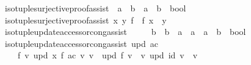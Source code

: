\begin{isabellebody}
\isanewline
\ \ iso{\isacharunderscore}{\kern0pt}tuple{\isacharunderscore}{\kern0pt}surjective{\isacharunderscore}{\kern0pt}proof{\isacharunderscore}{\kern0pt}assist\ {\isacharcolon}{\kern0pt}{\isacharcolon}{\kern0pt}\ {\isachardoublequoteopen}{\isacharprime}{\kern0pt}a\ {\isasymRightarrow}\ {\isacharprime}{\kern0pt}b\ {\isasymRightarrow}\ {\isacharparenleft}{\kern0pt}{\isacharprime}{\kern0pt}a\ {\isasymRightarrow}\ {\isacharprime}{\kern0pt}b{\isacharparenright}{\kern0pt}\ {\isasymRightarrow}\ bool{\isachardoublequoteclose}\ \isanewline
\ \ {\isachardoublequoteopen}iso{\isacharunderscore}{\kern0pt}tuple{\isacharunderscore}{\kern0pt}surjective{\isacharunderscore}{\kern0pt}proof{\isacharunderscore}{\kern0pt}assist\ x\ y\ f\ {\isasymlongleftrightarrow}\ f\ x\ {\isacharequal}{\kern0pt}\ y{\isachardoublequoteclose}\isanewline
\isanewline
{}\isamarkupfalse%
\isanewline
\ \ iso{\isacharunderscore}{\kern0pt}tuple{\isacharunderscore}{\kern0pt}update{\isacharunderscore}{\kern0pt}accessor{\isacharunderscore}{\kern0pt}cong{\isacharunderscore}{\kern0pt}assist\ {\isacharcolon}{\kern0pt}{\isacharcolon}{\kern0pt}\isanewline
\ \ \ \ {\isachardoublequoteopen}{\isacharparenleft}{\kern0pt}{\isacharparenleft}{\kern0pt}{\isacharprime}{\kern0pt}b\ {\isasymRightarrow}\ {\isacharprime}{\kern0pt}b{\isacharparenright}{\kern0pt}\ {\isasymRightarrow}\ {\isacharparenleft}{\kern0pt}{\isacharprime}{\kern0pt}a\ {\isasymRightarrow}\ {\isacharprime}{\kern0pt}a{\isacharparenright}{\kern0pt}{\isacharparenright}{\kern0pt}\ {\isasymRightarrow}\ {\isacharparenleft}{\kern0pt}{\isacharprime}{\kern0pt}a\ {\isasymRightarrow}\ {\isacharprime}{\kern0pt}b{\isacharparenright}{\kern0pt}\ {\isasymRightarrow}\ bool{\isachardoublequoteclose}\ \isanewline
\ \ {\isachardoublequoteopen}iso{\isacharunderscore}{\kern0pt}tuple{\isacharunderscore}{\kern0pt}update{\isacharunderscore}{\kern0pt}accessor{\isacharunderscore}{\kern0pt}cong{\isacharunderscore}{\kern0pt}assist\ upd\ ac\ {\isasymlongleftrightarrow}\isanewline
\ \ \ \ \ {\isacharparenleft}{\kern0pt}{\isasymforall}f\ v{\isachardot}{\kern0pt}\ upd\ {\isacharparenleft}{\kern0pt}{\isasymlambda}x{\isachardot}{\kern0pt}\ f\ {\isacharparenleft}{\kern0pt}ac\ v{\isacharparenright}{\kern0pt}{\isacharparenright}{\kern0pt}\ v\ {\isacharequal}{\kern0pt}\ upd\ f\ v{\isacharparenright}{\kern0pt}\ {\isasymand}\ {\isacharparenleft}{\kern0pt}{\isasymforall}v{\isachardot}{\kern0pt}\ upd\ id\ v\ {\isacharequal}{\kern0pt}\ v{\isacharparenright}{\kern0pt}{\isachardoublequoteclose}\isanewline
\isanewline
{}\isamarkupfalse%

\end{isabellebody}
